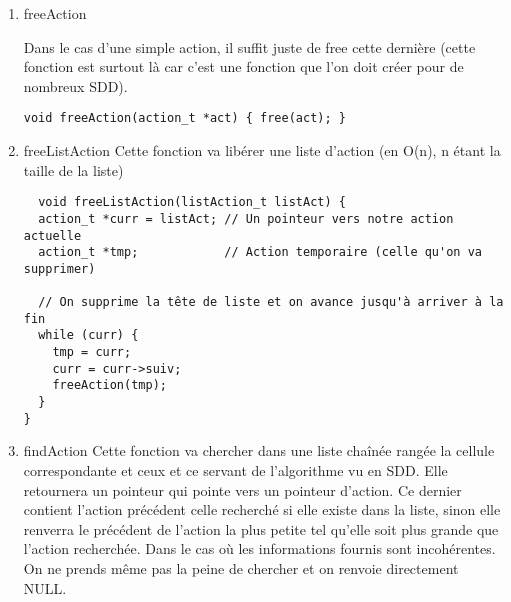 \documentclass[11pt]{article}
\begin{document}
\begin{enumerate}
\item freeAction
\label{sec:org034d12e}

Dans le cas d'une simple action, il suffit juste de free cette dernière
(cette fonction est surtout là car c'est une fonction que l'on doit créer
pour de nombreux SDD).

\begin{lstlisting}
void freeAction(action_t *act) { free(act); }
\end{lstlisting}


\item freeListAction
\label{sec:org5b2ca7a}
Cette fonction va libérer une liste d'action (en O(n), n étant la taille
de la liste)

\begin{lstlisting}
  void freeListAction(listAction_t listAct) {
  action_t *curr = listAct; // Un pointeur vers notre action actuelle
  action_t *tmp;            // Action temporaire (celle qu'on va supprimer)

  // On supprime la tête de liste et on avance jusqu'à arriver à la fin
  while (curr) {
    tmp = curr;
    curr = curr->suiv;
    freeAction(tmp);
  }
}
\end{lstlisting}


\item findAction
\label{sec:org0de4e72}
Cette fonction va chercher dans une liste chaînée rangée la cellule
correspondante et ceux et ce servant de l'algorithme vu en SDD. Elle
retournera un pointeur qui pointe vers un pointeur d'action. Ce dernier
contient l'action précédent celle recherché si elle existe dans la liste,
sinon elle renverra le précédent de l'action la plus petite tel qu'elle
soit plus grande que l'action recherchée. Dans le cas où les informations
fournis sont incohérentes. On ne prends même pas la peine de chercher et on
renvoie directement NULL.


\end{enumerate}
\end{document}
